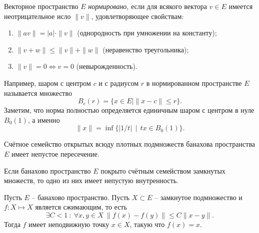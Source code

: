 
\begin{to_def}
    Векторное пространство $E$ \textit{нормировано}, если для всякого вектора $v \in E$ имеется неотрицательное исло $\|v\|$, удовлетворяющее свойствам:
    \begin{enumerate}
        \item $\|av\| = |a| \cdot \|v\|$ (однородность при умножении на константу);
        \item $\|v + w\| \leq \|v\| + \|w\|$ (неравенство треугольника);
        \item $\|v\|=0 \Leftrightarrow v = 0$ (невырожденность).
    \end{enumerate}
\end{to_def}

Например, шаром с центром $c$ и с радиусом $r$ в нормированном пространстве $E$ называется множество
\begin{equation*}
    B_c (r) = \{x \in E \mid
    \|x-c\|\leq r
    \}.
\end{equation*}
Заметим, что норма полностью определяется единичным шаром с центром в нуле $B_0 (1)$, а именно
\begin{equation*}
    \|x\| = \inf\{
        |1/t|\, \mid \, t x \in B_0 (1)
    \}.
\end{equation*}


\begin{to_thr}
    Счётное семейство открытых всюду плотных подмножеств банахова пространства $E$ имеет непустое пересечение.
\end{to_thr}

\begin{to_con}
    Если банахово пространство $E$ покрыто счётным семейством замкнутых множеств, то одно из них имеет непустую внутренность.
\end{to_con}

\begin{to_thr}
    Пусть $E$ -- банахово пространство. Пусть $X \subset E$ -- замкнутое подмножество и $f \colon  X \mapsto X$ является сжимающим, то есть
    \begin{equation*}
        \exists C < 1 \ \colon  \ \forall x, y \in X \ 
        \|f(x)-f(y)\| \leq C \|x-y\|.
    \end{equation*}
    Тогда $f$ имеет неподвижную точку $x \in X$, такую что $f(x) = x$.
\end{to_thr}


% 